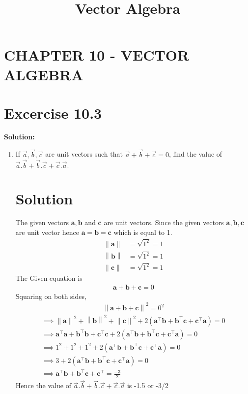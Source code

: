 \documentclass[12pt]{article}
\let\vec\mathbf
\providecommand{\norm}[1]{\left\lVert#1\right\rVert}
\newcommand{\solution}{\noindent \textbf{Solution: }}
\let\vec\mathbf
\begin{document}
\begin{center}
\title{\textbf{Vector Algebra}}
\date{\vspace{-5ex}} %
\maketitle
\end{center}
\setcounter{page}{1}
\section*{CHAPTER 10 - VECTOR ALGEBRA}
\section*{Excercise 10.3}
\solution 
\begin{enumerate}
\item If $\overrightarrow{a},\overrightarrow{b},\overrightarrow{c}$ are unit vectors such that $\overrightarrow{a}+\overrightarrow{b}+\overrightarrow{c}=0$, find the value of $\overrightarrow{a}.\overrightarrow{b}+\overrightarrow{b}.\overrightarrow{c}+\overrightarrow{c}.\overrightarrow{a}$.  
\section{Solution}
The given vectors $\vec{a},\vec{b}$ and $\vec{c}$ are unit vectors. Since the given vectors $\vec{a},\vec{b},\vec{c}$ are unit vector hence $\vec{a}=\vec{b}=\vec{c}$ which is equal to 1.
        \begin{align}
\norm{\vec{a}} &=\sqrt{1^2}=1\\ \norm{\vec{b}}&=\sqrt{1^2}=1\\ \norm{\vec{c}}&=\sqrt{1^2}=1
        \end{align}
The Given equation is 
        \begin{align}
\vec{a}+\vec{b}+\vec{c}=0
\end{align}      
Squaring on both sides,
\begin{align}
\norm{{\vec{a}}+{\vec{b}}+{\vec{c}}}^2=0^2
\end{align}
\begin{align}
\implies{\norm{\vec{a}}}^2+{\norm{\vec{b}}}^2+{\norm{\vec{c}}}^2+2({{\vec{a}^\top}{\vec{b}}+{\vec{b}^\top}{\vec{c}}+{\vec{c}^\top}{\vec{a}}})=0\\
\implies{\vec{a}^\top\vec{a}}+{\vec{b}^\top\vec{b}}+{\vec{c}^\top\vec{c}}+2({{\vec{a}^\top}{\vec{b}}+{\vec{b}^\top}{\vec{c}}+{\vec{c}^\top}{\vec{a}}})=0\\
\implies{1}^2+{1}^2+{1}^2+2({{\vec{a}^\top}{\vec{b}}+{\vec{b}^\top}{\vec{c}}+{\vec{c}^\top}{\vec{a}}})=0\\
\implies3+2({{\vec{a}^\top}{\vec{b}}+{\vec{b}^\top}{\vec{c}}+{\vec{c}^\top}{\vec{a}}})=0\\
\implies{\vec{a}^\top}{\vec{b}}+{\vec{b}^\top}{\vec{c}}+{\vec{c}^\top}=\frac{-3}{2}
\end{align}
Hence the value of $\overrightarrow{a}.\overrightarrow{b}+\overrightarrow{b}.\overrightarrow{c}+\overrightarrow{c}.\overrightarrow{a}$ is -1.5 or -3/2
\end{enumerate}
\end{document}
